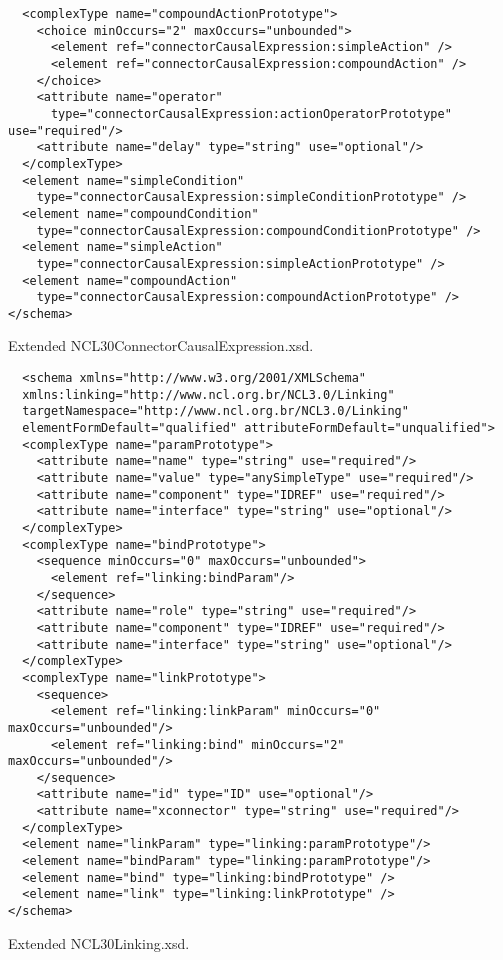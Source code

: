 \begin{listing}[!ht]
\begin{verbatim}
  <complexType name="compoundActionPrototype">
    <choice minOccurs="2" maxOccurs="unbounded">
      <element ref="connectorCausalExpression:simpleAction" />
      <element ref="connectorCausalExpression:compoundAction" />
    </choice>
    <attribute name="operator"
      type="connectorCausalExpression:actionOperatorPrototype" use="required"/>
    <attribute name="delay" type="string" use="optional"/>
  </complexType>
  <element name="simpleCondition"
    type="connectorCausalExpression:simpleConditionPrototype" />
  <element name="compoundCondition"
    type="connectorCausalExpression:compoundConditionPrototype" />
  <element name="simpleAction"
    type="connectorCausalExpression:simpleActionPrototype" />
  <element name="compoundAction"
    type="connectorCausalExpression:compoundActionPrototype" />
</schema>
\end{verbatim}
\caption{Extended NCL30ConnectorCausalExpression.xsd.}
\label{list:annexa4}
\end{listing}

\begin{listing}[!ht]
\begin{verbatim}
  <schema xmlns="http://www.w3.org/2001/XMLSchema"
  xmlns:linking="http://www.ncl.org.br/NCL3.0/Linking"
  targetNamespace="http://www.ncl.org.br/NCL3.0/Linking"
  elementFormDefault="qualified" attributeFormDefault="unqualified">
  <complexType name="paramPrototype">
    <attribute name="name" type="string" use="required"/>
    <attribute name="value" type="anySimpleType" use="required"/>
    <attribute name="component" type="IDREF" use="required"/>
    <attribute name="interface" type="string" use="optional"/>
  </complexType>
  <complexType name="bindPrototype">
    <sequence minOccurs="0" maxOccurs="unbounded">
      <element ref="linking:bindParam"/>
    </sequence>
    <attribute name="role" type="string" use="required"/>
    <attribute name="component" type="IDREF" use="required"/>
    <attribute name="interface" type="string" use="optional"/>
  </complexType>
  <complexType name="linkPrototype">
    <sequence>
      <element ref="linking:linkParam" minOccurs="0" maxOccurs="unbounded"/>
      <element ref="linking:bind" minOccurs="2" maxOccurs="unbounded"/>
    </sequence>
    <attribute name="id" type="ID" use="optional"/>
    <attribute name="xconnector" type="string" use="required"/>
  </complexType>
  <element name="linkParam" type="linking:paramPrototype"/>
  <element name="bindParam" type="linking:paramPrototype"/>
  <element name="bind" type="linking:bindPrototype" />
  <element name="link" type="linking:linkPrototype" />
</schema>
\end{verbatim}
\caption{ Extended NCL30Linking.xsd.}
\label{list:annexa5}
\end{listing}

